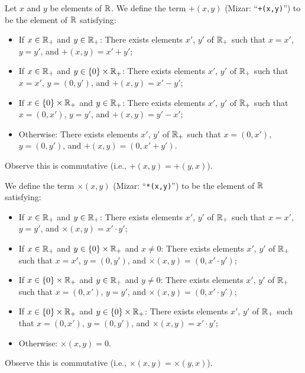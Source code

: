 \documentclass{article}
\begin{document}
\begin{definition}
Let $x$ and $y$ be elements of $\mathbb{R}$.
We define the term $+(x,y)$ (Mizar: ``\verb#+(x,y)#'') to be the element
of $\mathbb{R}$ satisfying:
\begin{defn}
\item \begin{itemize}
\item If $x\in\mathbb{R}_{+}$ and $y\in\mathbb{R}_{+}$: There exists elements $x'$,
  $y'$ of $\mathbb{R}_{+}$ such that $x=x'$, $y=y'$, and $+(x,y)=x'+y'$;
\item If $x\in\mathbb{R}_{+}$ and $y\in\{0\}\times\mathbb{R}_{+}$: There exists
  elements $x'$, $y'$ of $\mathbb{R}_{+}$ such that $x=x'$, $y=(0,y')$, and $+(x,y)=x'-y'$;
\item If $x\in\{0\}\times\mathbb{R}_{+}$ and $y\in\mathbb{R}_{+}$: There exists
  elements $x'$, $y'$ of $\mathbb{R}_{+}$ such that $x=(0,x')$, $y=y'$, and $+(x,y)=y'-x'$;
\item Otherwise: There exists elements $x'$, $y'$ of $\mathbb{R}_{+}$ such that $x=(0,x')$, $y=(0,y')$, and
  $+(x,y) = (0, x'+y')$.
\end{itemize}
\end{defn}
Observe this is commutative (i.e., $+(x,y)=+(y,x)$).

We define the term $\times(x,y)$ (Mizar: ``\verb#*(x,y)#'') to be the
element of $\mathbb{R}$ satisfying:
\begin{defn}
\item \begin{itemize}
\item If $x\in\mathbb{R}_{+}$ and $y\in\mathbb{R}_{+}$: There exists elements $x'$,
  $y'$ of $\mathbb{R}_{+}$ such that $x=x'$, $y=y'$, and $\times(x,y)=x'\cdot y'$;
\item If $x\in\mathbb{R}_{+}$ and $y\in\{0\}\times\mathbb{R}_{+}$ and $x\neq0$: There exists elements $x'$,
  $y'$ of $\mathbb{R}_{+}$ such that $x=x'$, $y=(0,y')$, and $\times(x,y)=(0,x'\cdot y')$;
\item If $x\in\{0\}\times\mathbb{R}_{+}$ and $y\in\mathbb{R}_{+}$ and $y\neq0$: There exists elements $x'$,
  $y'$ of $\mathbb{R}_{+}$ such that $x=(0,x')$, $y=y'$, and $\times(x,y)=(0,x'\cdot y')$;
\item If $x\in\{0\}\times\mathbb{R}_{+}$ and $y\in\{0\}\times\mathbb{R}_{+}$: There exists elements $x'$,
  $y'$ of $\mathbb{R}_{+}$ such that $x=(0,x')$, $y=(0,y')$, and $\times(x,y)=x'\cdot y'$;
\item Otherwise: $\times(x,y)=0$.
\end{itemize}
\end{defn}
Observe this is commutative (i.e., $\times(x,y)=\times(y,x)$).
\end{definition}
\end{document}
